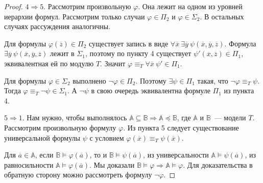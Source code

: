 \begin{proof}

    
    $4\Rightarrow 5$. Рассмотрим произвольную $\varphi$. Она лежит на одном из уровней иерархии формул. Рассмотрим только случаи $\varphi\in \Pi_2$ и $\varphi\in\Sigma_2$. В остальных случаях рассуждения аналогичны.

    Для формулы $\varphi(\overline{z})\in\Pi_2$ существует запись в виде $\forall \overline{x}~\exists \overline{y}~\psi(\overline{x}, \overline{y}, \overline{z})$. Формула $\exists \overline{y}~\psi(\overline{x}, \overline{y}, \overline{z})$ лежит в $\Sigma_1$, поэтому по пункту 4 существует $\psi'(\overline{x}, \overline{z})\in\Pi_1$, эквивалентная ей по модулю $T$. Значит $\varphi \equiv_T \forall \overline{x}~\psi' \in \Pi_1$.

    Для формулы $\varphi\in\Sigma_2$ выполнено $\neg\varphi\in\Pi_2$. Поэтому $\exists\psi\in\Pi_1$ такая, что $\neg\varphi \equiv_T \psi$. Тогда $\varphi\equiv_T\neg\psi\in\Sigma_1$. А $\neg\psi$ в свою очередь эквивалентна формуле $\Pi_1$ из пункта 4.

    $5 \Rightarrow 1$. Нам нужно, чтобы выполнялось $\mathbb{A} \subseteq \mathbb{B} \Rightarrow \mathbb{A} \preceq \mathbb{B}$, где $\mathbb{A}$ и $\mathbb{B}$~— модели $T$. Рассмотрим произвольную формулу $\varphi$. Из пункта 5 следует существование универсальной формулы $\psi$ с условием $\varphi(\overline{x}) \equiv_T \psi(\overline{x})$.


    Для $\overline{a}\in\mathbb{A}$, если $\mathbb{B} \models \varphi(\overline{a})$, то и $\mathbb{B} \models  \psi(\overline{a})$, из универсальности $\mathbb{A} \models \psi(\overline{a})$, из равносильности $\mathbb{A}\models\varphi(\overline{a})$. Мы доказали $\mathbb{B}\models\varphi\Rightarrow\mathbb{A}\models\varphi$. Для доказательства в обратную сторону можно рассмотреть формулу $\neg\varphi$.
\end{proof} 


